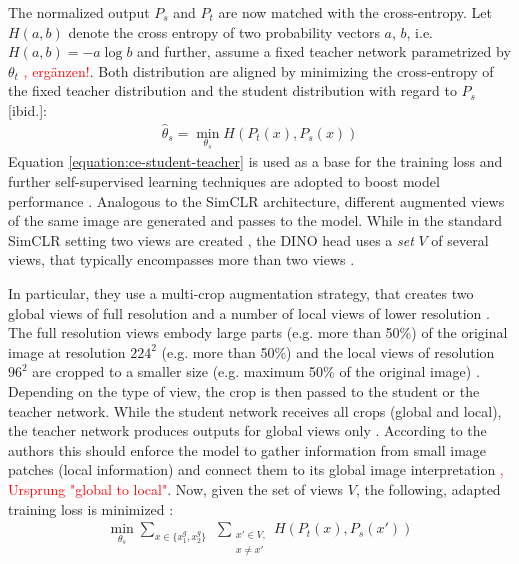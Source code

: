 \par
The normalized output $P_s$ and $P_t$ are now matched with the cross-entropy.
Let $H(a,b)$ denote the cross entropy of two probability vectors $a$, $b$, i.e. $H(a,b)=-a \log b$ and further, assume a fixed teacher network parametrized by $\theta_t$ \textcolor{red}{\citep{Caron2021}, ergänzen!}.
Both distribution are aligned by minimizing the cross-entropy of the fixed teacher distribution and the student distribution with regard to $P_s$ [ibid.]: 
\begin{align}
	\hat{\theta}_s = \min_{\theta_s}H(P_t(x),P_s(x))
	\label{equation:ce-student-teacher}	
\end{align}
Equation \ref{equation:ce-student-teacher} is used as a base for the training loss and further self-supervised learning techniques are adopted to boost model performance \citep{Caron2021}.
Analogous to the SimCLR architecture, different augmented views of the same image are generated and passes to the model.
While in the standard SimCLR setting two views are created \citep{Chen2020}, the DINO head uses a \textit{set} $V$ of several views, that typically encompasses more than two views \citep{Caron2021}.
\par
In particular, they use a multi-crop augmentation strategy, that creates two global views of full resolution and a number of local views of lower resolution \citep{Caron2020, Caron2021}. 
The full resolution views embody large parts (e.g. more than 50\%) of the original image at resolution $224^2$ (e.g. more than 50\%) and the local views of resolution $96^2$ are cropped to a smaller size (e.g. maximum 50\% of the original image) \citep{Caron2021}.
Depending on the type of view, the crop is then passed to the student or the teacher network.
While the student network receives all crops (global and local), the teacher network produces outputs for global views only \citep{Caron2021}.
According to the authors this should enforce the model to gather information from small image patches (local information) and connect them to its global image interpretation \textcolor{red}{\citep{Caron2021}, Ursprung "global to local"}.
Now, given the set of views $V$, the following, adapted training loss is minimized \citep{Caron2021}:
\begin{align}
	\min_{\theta_s}\sum_{x \in \{x_1^g, x_2^g\}} \hspace{5pt} \sum_{\substack{ x\prime \in V, \\ x\neq x\prime}} H(P_t(x),P_s(x\prime))
	\label{equation:dino-training-objective}
\end{align}
